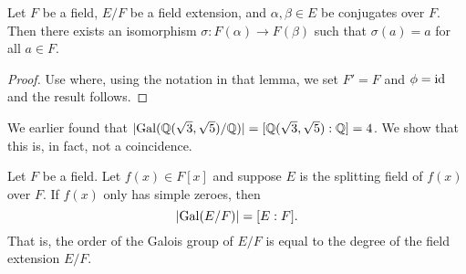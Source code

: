 \begin{proposition}
    Let $F$ be a field, $E/F$ be a field extension, and $\alpha,\beta \in E$ be conjugates over $F$. Then there exists an isomorphism $\sigma: F(\alpha) \to F(\beta)$ such that $\sigma(a) = a$ for all $a \in F$.
\end{proposition}
\begin{proof}
    Use  where, using the notation in that lemma, we set $F' = F$ and $\phi = \mathrm{id}$ and the result follows.
\end{proof}

We earlier found that $|\mathrm{Gal}(\mathbb{Q}(\sqrt3,\sqrt5)/\mathbb{Q})| = [\mathbb{Q}(\sqrt3,\sqrt5):\mathbb{Q}] = 4$. We show that this is, in fact, not a coincidence.

\begin{theorem}\label{thrm-order-of-galois-group-is-degree-of-field-extension}
    Let $F$ be a field. Let $f(x) \in F[x]$ and suppose $E$ is the splitting field of $f(x)$ over $F$. If $f(x)$ only has simple zeroes, then
    \[
        |\mathrm{Gal}(E/F)| = [E:F].
    \]
    That is, the order of the Galois group of $E/F$ is equal to the degree of the field extension $E/F$.
\end{theorem}

